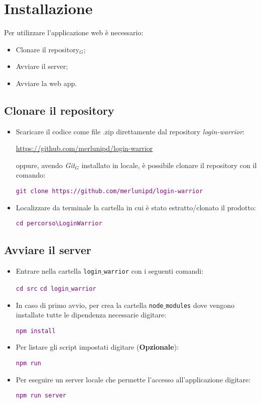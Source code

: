\chapter{Installazione}
Per utilizzare l'applicazione web è necessario:
\begin{itemize}
  \item Clonare il repository$_G$;
  \item Avviare il server;
  \item Avviare la web app.
\end{itemize}
\section{Clonare il repository}
\begin{itemize}
  \item Scaricare il codice come file .zip direttamente dal repository \textit{login-warrior}:
  \begin{center}
    \url{https://github.com/merlunipd/login-warrior}
  \end{center}
  oppure, avendo \textit{Git}$_G$ installato in locale, è possibile clonare il repository con il comando:
  \begin{center}
    \textcolor{purple}{\texttt{git clone https://github.com/merlunipd/login-warrior}}
  \end{center}
  \item Localizzare da terminale la cartella in cui è stato estratto/clonato il prodotto:
  \begin{center}
    \textcolor{purple}{\texttt{cd percorso\textbackslash LoginWarrior}}
  \end{center}
\end{itemize}

\section{Avviare il server}
\begin{itemize}
  \item Entrare nella cartella \texttt{login$\_$warrior} con i seguenti comandi:
  \begin{center}
    \textcolor{purple}{\texttt{cd src}
    \texttt{cd login$\_$warrior}}
  \end{center}
  \item In caso di primo avvio, per crea la cartella \texttt{node$\_$modules} dove vengono installate tutte le dipendenza necessarie digitare:
  \begin{center}
    \textcolor{purple}{\texttt{npm install}}
  \end{center}
  \item Per listare gli script impostati digitare (\textbf{Opzionale}):
  \begin{center}
    \textcolor{purple}{\texttt{npm run}}
  \end{center}
  \item Per eseguire un server locale che permette l'accesso all'applicazione digitare:
  \begin{center}
    \textcolor{purple}{\texttt{npm run server}}
  \end{center}
\end{itemize}

